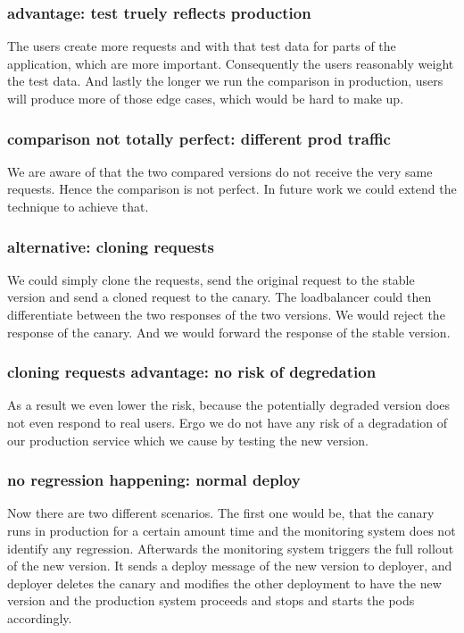\subsubsection{advantage: test truely reflects production}
The users create more requests and with that test data for parts of the application, which
are more important. Consequently the users reasonably weight the test data. And lastly the
longer we run the comparison in production, users will produce more of those edge cases,
which would be hard to make up.

\subsubsection{comparison not totally perfect: different prod traffic}
We are aware of that the two compared versions do not receive the very same
requests. Hence the comparison is not perfect. In future work we could extend the
technique to achieve that.

\subsubsection{alternative: cloning requests}
We could simply clone the requests, send the original request to the stable version and
send a cloned request to the canary. The loadbalancer could then differentiate between the
two responses of the two versions. We would reject the response of the canary. And we
would forward the response of the stable version.

\subsubsection{cloning requests advantage: no risk of degredation}
As a result we even lower the risk, because the potentially degraded version does not even
respond to real users. Ergo we do not have any risk of a degradation of our production
service which we cause by testing the new version.

\subsubsection{no regression happening: normal deploy}
Now there are two different scenarios. The first one would be, that the canary runs in
production for a certain amount time and the monitoring system does not identify any
regression. Afterwards the monitoring system triggers the full rollout of the new
version. It sends a deploy message of the new version to deployer, and deployer deletes
the canary and modifies the other deployment to have the new version and the production
system proceeds and stops and starts the pods accordingly.


